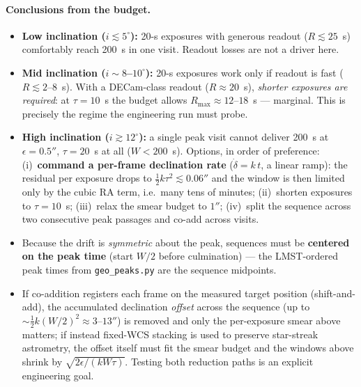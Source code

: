 \documentclass[11pt]{article}
\newcommand{\arcsecs}{\ensuremath{''}}
\begin{document}
\paragraph{Conclusions from the budget.}
\begin{itemize}
  \item \textbf{Low inclination ($i \lesssim 5^{\circ}$):} 20-s exposures with generous
        readout ($R\lesssim25$~s) comfortably reach 200~s in one visit. Readout losses
        are not a driver here.
  \item \textbf{Mid inclination ($i \sim 8$--$10^{\circ}$):} 20-s exposures work only if
        readout is fast ($R\lesssim 2$--$8$~s). With a DECam-class readout
        ($R \approx 20$~s), \emph{shorter exposures are required}: at $\tau=10$~s the
        budget allows $R_{\max}\approx12$--$18$~s --- marginal. This is precisely the
        regime the engineering run must probe.
  \item \textbf{High inclination ($i \gtrsim 12^{\circ}$):} a single peak visit cannot
        deliver 200~s at $\epsilon=0.5\arcsecs$, $\tau=20$~s at all ($W<200$~s). Options,
        in order of preference: (i)~\textbf{command a per-frame declination rate}
        ($\dot\delta = k\,t$, a linear ramp): the residual per exposure drops to
        $\tfrac12 k\tau^{2}\lesssim0.06\arcsecs$ and the window is then limited only by
        the cubic RA term, i.e.\ many tens of minutes; (ii)~shorten exposures to
        $\tau=10$~s; (iii)~relax the smear budget to $1\arcsecs$; (iv)~split the sequence
        across two consecutive peak passages and co-add across visits.
  \item Because the drift is \emph{symmetric} about the peak, sequences must be
        \textbf{centered on the peak time} (start $W/2$ before culmination) --- the
        LMST-ordered peak times from \texttt{geo\_peaks.py} are the sequence midpoints.
  \item If co-addition registers each frame on the measured target position
        (shift-and-add), the accumulated declination \emph{offset} across the sequence
        (up to $\sim\!\tfrac12 k (W/2)^2 \approx 3$--$13\arcsecs$) is removed and only the
        per-exposure smear above matters; if instead fixed-WCS stacking is used to
        preserve star-streak astrometry, the offset itself must fit the smear budget and
        the windows above shrink by $\sqrt{2\epsilon/(kW\tau)}$. Testing both reduction
        paths is an explicit engineering goal.
\end{itemize}
\end{document}
